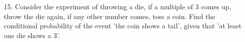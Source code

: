 \begin{enumerate}[label=\thechapter.\arabic*,ref=\thechapter.\theenumi]
\item [15.] Consider the experiment of throwing a die, if a multiple of 3 comes up, throw the die again, if any other number comes, toss a coin. Find the conditional probability of the event 'the coin shows a tail', given that 'at least one die shows a 3'.
\end{enumerate}
